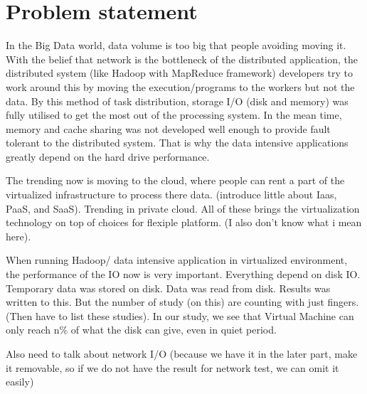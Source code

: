 \documentclass{acmsig}
\begin{document}
\section{Problem statement}
In the Big Data world, data volume is too big that people avoiding moving it. With the belief that network is the bottleneck of the distributed application, the distributed system (like Hadoop with MapReduce framework) developers try to work around this by moving the execution/programs to the workers but not the data. By this method of task distribution, storage I/O (disk and memory) was fully utilised to get the most out of the processing system. In the mean time, memory and cache sharing was not developed well enough to provide fault tolerant to the distributed system. That is why the data intensive applications greatly depend on the hard drive performance.

The trending now is moving to the cloud, where people can rent a part of the virtualized infrastructure to process there data. (introduce little about Iaas, PaaS, and SaaS).
Trending in private cloud. All of these brings the virtualization technology on top of choices for flexiple platform. (I also don't know what i mean here). 

When running Hadoop/ data intensive application in virtualized environment, the performance of the IO now is very important. Everything depend on disk IO. Temporary data was stored on disk. Data was read from disk. Results was written to this. But the number of study (on this) are counting with just fingers. (Then have to list these studies). In our study, we see that Virtual Machine can only reach {n}\% of what the disk can give, even in quiet period.

Also need to talk about network I/O (because we have it in the later part, make it removable, so if we do not have the result for network test, we can omit it easily)
\end{document}
